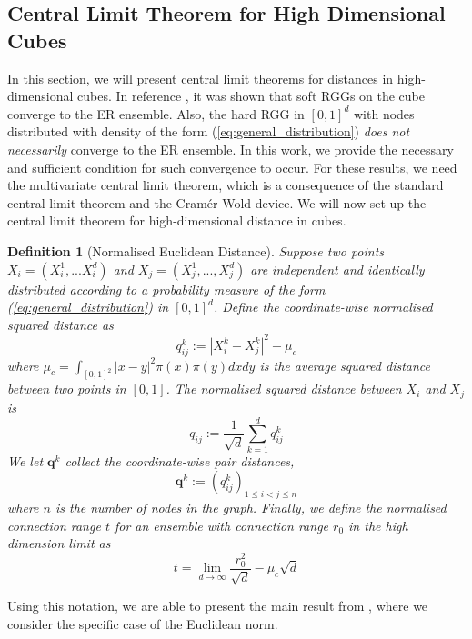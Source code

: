 \documentclass{article}
\newtheorem{definition}{Definition}
\newtheorem{theorem}{Theorem}
\newcommand{\tti}{\rightarrow\infty}
\begin{document}
\subsection{Central Limit Theorem for High Dimensional Cubes}
In this section, we will present central limit theorems for distances in high-dimensional cubes.  In reference \cite{erba2020random}, it was shown that soft RGGs on the cube converge to the ER ensemble. Also, the hard RGG in $[0,1]^d$ with nodes distributed with density of the form (\ref{eq:general_distribution}) \textit{does not necessarily} converge to the ER ensemble. In this work, we provide the necessary and sufficient condition for such convergence to occur. For these results, we need the multivariate central limit theorem, which is a consequence of the standard central limit theorem and the Cram\'er-Wold device.
We will now set up the central limit theorem for high-dimensional distance in cubes.
\begin{definition}[Normalised Euclidean Distance]
    \label{def:cube_distances}
    Suppose two points $X_i = (X_i^1,...X_i^d)$ and $X_j = (X_j^1,...,X_j^d)$ are independent and identically distributed according to a probability measure of the form (\ref{eq:general_distribution}) in $[0,1]^d$. Define the coordinate-wise  normalised squared distance  as
    \begin{equation}
        q_{ij}^k := |X_i^k-X_j^k|^2 - \mu_c
    \end{equation}
    where $\mu_c = \int_{{[0,1]^2}} |x-y|^2 \pi(x)\pi(y) dxdy$ is the average squared distance between two points in $[0,1]$. The  normalised squared distance  between $X_i$ and $X_j$ is
    \begin{equation}
        q_{ij} := \frac{1}{\sqrt{d}}\sum_{k=1}^d q_{ij}^k
    \end{equation}
    We let $\boldsymbol{q}^k$ collect the coordinate-wise pair distances,
    \begin{equation}
        \boldsymbol{q}^k := (q_{ij}^k)_{1\leq i < j \leq n}
    \end{equation}
    where $n$ is the number of nodes in the graph. Finally, we define the normalised connection range $t$ for an ensemble with connection range $r_0$ in the high dimension limit as
    \begin{equation}
        t = \lim_{d\tti} \frac{r_0^2}{\sqrt{d}}-\mu_c\sqrt{d}
    \end{equation}
\end{definition}
Using this notation, we are able to present the main result from \cite{erba2020random}, where we consider the specific case of the Euclidean norm.
\end{document}
